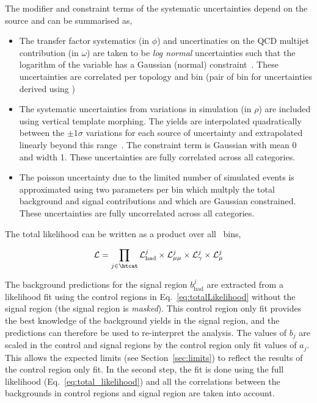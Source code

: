 The modifier and constraint terms of the systematic uncertainties depend on the source
and can be summarised as,
\begin{itemize}
\item The transfer factor systematics (in $\phi$) and uncertinaties on the QCD multijet contribution (in $\omega$)  
are taken to be \emph{log normal} uncertainties such that the logarithm of the variable has 
a Gaussian (normal) constraint~\cite{templateMorphing}. These uncertainties are correlated per topology and \scalht bin 
(pair of \scalht bin for uncertainties derived using \mmj)
\item The systematic uncertainties from variations in simulation (in $\rho$) are included using vertical template morphing.
The yields are interpolated quadratically between the $\pm 1\sigma$ variations for each source of
uncertainty and extrapolated linearly beyond this range~\cite{templateMorphing}. The constraint term is Gaussian
with mean 0 and width 1. These uncertainties are fully correlated across all categories.
\item The poisson uncertainty due to the limited number of simulated events is approximated using
two parameters per bin which multply the total background and signal contributions and which 
are Gaussian constrained. These uncertainties are fully uncorrelated across all categories.
\end{itemize}

The total likelihood can be written as a product over all \htcat~bins,

\begin{equation}
\label{eq:totalLikelihood}
\mathcal{L} = \prod_{j\in\htcat} \mathcal{L}^{j}_{\mathrm{had}} \times \mathcal{L}^{j}_{\mathrm{\mu\mu}} 
\times \mathcal{L}^{j}_{\mathrm{\gamma}} \times \mathcal{L}^{j}_{\mathrm{\mu}}
\end{equation}

The background predictions for the signal region $b^{j}_{\mathrm{had}}$ are extracted from a likelihood fit 
using the control regions in Eq.~\ref{eq:totalLikelihood} without the signal region (the signal region is \emph{masked}). 
This control region only fit provides the best knowledge of the background yields in the signal region, 
and the predictions can therefore be used to re-interpret the analysis. The values of $b_j$ are 
scaled in the control and signal regions by the control region only fit values of $a_j$.
This allows the expected limits (see Section~\ref{sec:limits}) to reflect the results of the control region only fit.
In the second step, the fit is done using the full likelihood (Eq.~\ref{eq:total_likelihood}) and all 
the correlations between the backgrounds in control regions and signal region are taken into account.

